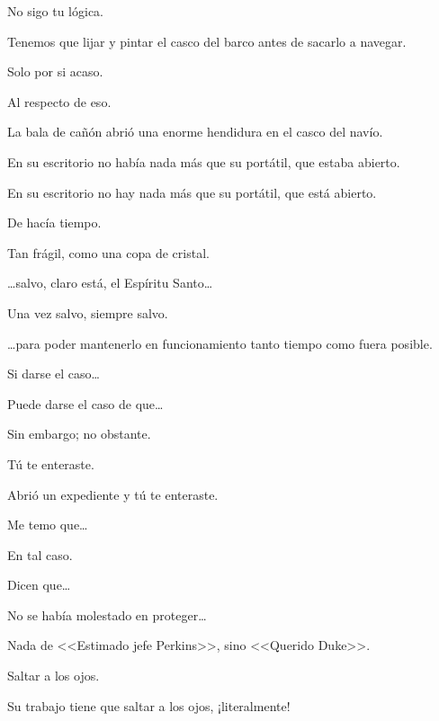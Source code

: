 \sk
No sigo tu lógica. 

\sk
Tenemos que lijar y pintar el casco del barco antes de sacarlo a navegar. 

\sk
Solo por si acaso. 

\sk
Al respecto de eso. 

\sk
La bala de cañón abrió una enorme hendidura en el casco del navío. 

\sk
En su escritorio no había nada más que su portátil, que estaba abierto. 

\sk
En su escritorio no hay nada más que su portátil, que está abierto.\nb{}

\sk
De hacía tiempo. 

\sk
Tan frágil, como una copa de cristal.\nb{}

\sk
\ldots{}salvo, claro está, el Espíritu Santo\ldots{}\nb{}

\sk
Una vez salvo, siempre salvo. 

\sk
\ldots{}para poder mantenerlo en funcionamiento tanto tiempo como fuera posible. 

\sk
Si darse el caso\ldots{} 

\sk
Puede darse el caso de que\ldots{} 

\sk
Sin embargo; no obstante. 

\sk
Tú te enteraste. 

\sk
Abrió un expediente y tú te enteraste. 

\sk
Me temo que\ldots{} 

\sk
En tal caso. 

\sk
Dicen que\ldots{} 

\sk
No se había molestado en proteger\ldots{} 

\sk
Nada de <<Estimado jefe Perkins>>, sino <<Querido Duke>>.\nb{}

\sk
Saltar a los ojos. 

\sk
Su trabajo tiene que saltar a los ojos, ¡literalmente! 


